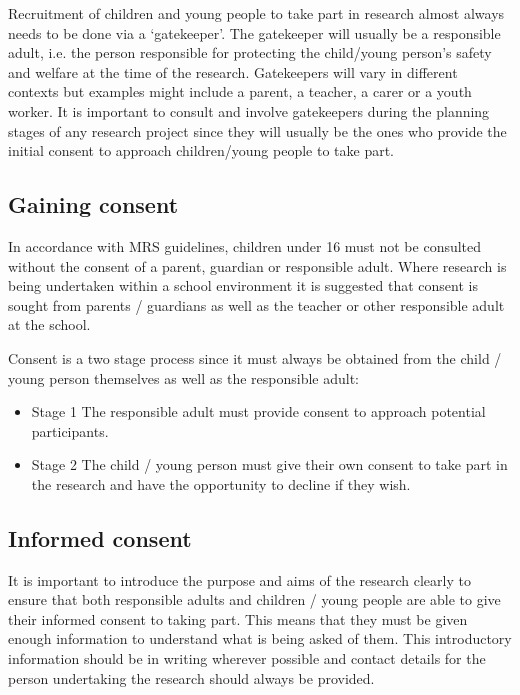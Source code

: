 Recruitment of children and young people to take part in research almost always needs to be done via a ‘gatekeeper’. The gatekeeper will usually be a responsible adult, i.e. the person responsible for protecting the child/young person’s safety and welfare at the time of the research. Gatekeepers will vary in different contexts but examples might include a parent, a teacher, a carer or a youth worker. It is important to consult and involve gatekeepers during the planning stages of any research project since they will usually be the ones who provide the initial consent to approach children/young people to take part.

\subsection{Gaining consent}

In accordance with MRS guidelines, children under 16 must not be consulted without the consent of a parent, guardian or responsible adult. Where research is being undertaken within a school environment it is suggested that consent is sought from parents / guardians as well as the teacher or other responsible adult at the school.

Consent is a two stage process since it must always be obtained from the child / young person themselves as well as the responsible adult:

\begin{itemize}
	\item Stage 1 The responsible adult must provide consent to approach potential participants.

	\item Stage 2 The child / young person must give their own consent to take part in the research and have the opportunity to decline if they wish.
\end{itemize}

\subsection{Informed consent}

It is important to introduce the purpose and aims of the research clearly to ensure that both responsible adults and children / young people are able to give their informed consent to taking part. This means that they must be given enough information to understand what is being asked of them. This introductory information should be in writing wherever possible and contact details for the person undertaking the research should always be provided.


